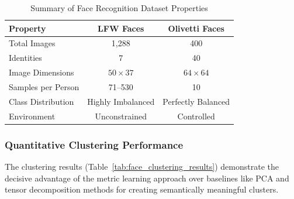 \documentclass[a4paper,12pt,reqno]{amsart}
\theoremstyle{definition}
\theoremstyle{remark}
\begin{document}
\begin{table}[h!]
	\centering
	\caption{Summary of Face Recognition Dataset Properties}
	\begin{tabular}{lcc}
		\toprule
		\textbf{Property} & \textbf{LFW Faces} & \textbf{Olivetti Faces} \\
		\midrule
		Total Images & 1,288 & 400 \\
		Identities & 7 & 40 \\
		Image Dimensions & $50 \times 37$ & $64 \times 64$ \\
		Samples per Person & 71--530 & 10 \\
		Class Distribution & Highly Imbalanced & Perfectly Balanced \\
		Environment & Unconstrained & Controlled \\
		\bottomrule
	\end{tabular}
	\label{tab:stat}
\end{table}

\subsubsection*{Quantitative Clustering Performance}

The clustering results (Table~\ref{tab:face_clustering_results}) demonstrate the decisive advantage of the metric learning approach over baselines like PCA and tensor decomposition methods for creating semantically meaningful clusters.
\end{document}
